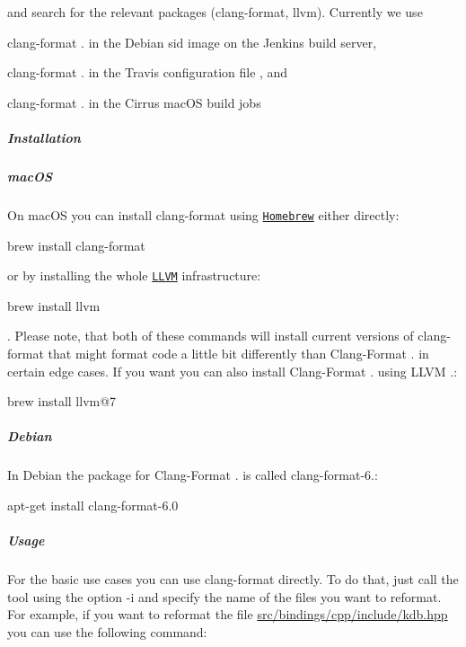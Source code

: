 and search for the relevant packages ({\ttfamily clang-\/format}, {\ttfamily llvm}). Currently we use


\begin{DoxyItemize}
\item clang-\/format {.} in the Debian sid image on the Jenkins build server,
\item clang-\/format {.} in the Travis configuration file , and
\item clang-\/format {.} in the Cirrus mac\+OS build jobs
\end{DoxyItemize}

\subparagraph*{Installation}

\subparagraph*{mac\+OS}

On mac\+OS you can install {\ttfamily clang-\/format} using \href{https://brew.sh}{\tt Homebrew} either directly\+:


\begin{DoxyCode}
brew install clang-format
\end{DoxyCode}


or by installing the whole \href{http://llvm.org}{\tt L\+L\+VM} infrastructure\+:


\begin{DoxyCode}
brew install llvm
\end{DoxyCode}


. Please note, that both of these commands will install current versions of {\ttfamily clang-\/format} that might format code a little bit differently than Clang-\/\+Format {.} in certain edge cases. If you want you can also install Clang-\/\+Format {.} using L\+L\+VM {.}\+:


\begin{DoxyCode}
brew install llvm@7
\end{DoxyCode}


\subparagraph*{Debian}

In Debian the package for Clang-\/\+Format {.} is called {\ttfamily clang-\/format-\/6.}\+:


\begin{DoxyCode}
apt-get install clang-format-6.0
\end{DoxyCode}


\subparagraph*{Usage}

For the basic use cases you can use {\ttfamily clang-\/format} directly. To do that, just call the tool using the option {\ttfamily -\/i} and specify the name of the files you want to reformat. For example, if you want to reformat the file {\ttfamily \hyperlink{kdb_8hpp}{src/bindings/cpp/include/kdb.\+hpp}} you can use the following command\+:



